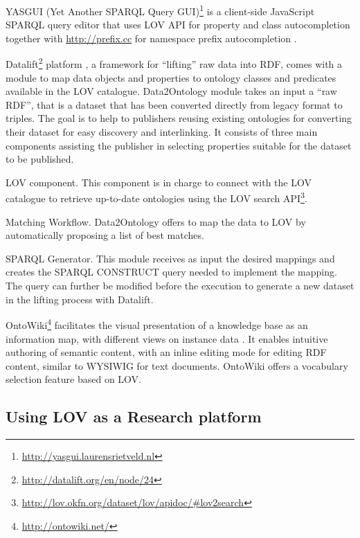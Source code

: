 \documentclass{iosart2c}
\newcommand{\maria}[1]{\textcolor{blue}{\textbf{[MARIA TO:#1]}}}
\begin{document}
YASGUI (Yet Another SPARQL Query GUI)\footnote{\url{http://yasgui.laurensrietveld.nl}} is a client-side JavaScript SPARQL query editor that uses LOV API for property and class autocompletion together with \url{http://prefix.cc} for namespace prefix autocompletion \cite{yasgui}.

Datalift\footnote{\url{http://datalift.org/en/node/24}} platform \cite{scharffe_2012}, a framework for ``lifting'' raw data into RDF, comes with a module to map data objects and properties to ontology classes and predicates available in the LOV catalogue. Data2Ontology module takes an input a ``raw RDF'', that is a dataset that has been converted directly from legacy format to triples. The goal is to help to publishers reusing existing ontologies for converting their dataset for easy discovery and interlinking. It consists of three main components assisting the publisher in selecting properties suitable for the dataset to be published. 
\begin{description}
\item LOV component. This component is in charge to connect with the LOV catalogue to retrieve up-to-date ontologies using the LOV search API\footnote{\url{http://lov.okfn.org/dataset/lov/apidoc/\#lov2search}}.
\item Matching Workflow. Data2Ontology offers to map the data to LOV by automatically proposing a list of best matches.
\item SPARQL Generator. This module receives as input the desired mappings and creates the SPARQL CONSTRUCT query needed to implement the mapping. The query can further be modified before the execution to generate a new dataset in the lifting process with Datalift.
\end{description}

OntoWiki\footnote{\url{http://ontowiki.net/}} facilitates the visual presentation of a knowledge base as an information map, with different views on instance data \cite{auer2006ontowiki}. It enables intuitive authoring of semantic content, with an inline editing mode for editing RDF content, similar to WYSIWIG for text documents. OntoWiki offers a vocabulary selection feature based on LOV.

\subsection{Using LOV as a Research platform}
\end{document}
